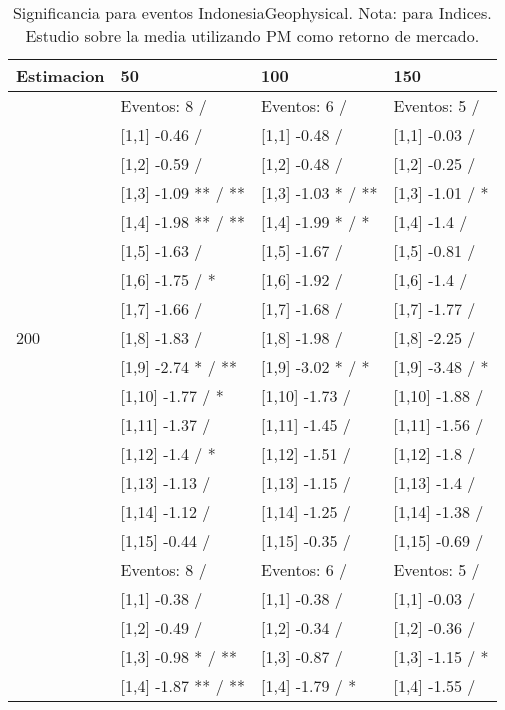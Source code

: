 \begin{table}

\caption{Significancia para eventos IndonesiaGeophysical. Nota: para Indices. Estudio sobre la media utilizando PM como retorno de mercado.}
\centering
\begin{tabular}[t]{llll}
\toprule
Estimacion & 50 & 100 & 150\\
\midrule
 & Eventos:  8 / & Eventos:  6 / & Eventos:  5 /\\
 & {}[1,1] -0.46  / & {}[1,1] -0.48  / & {}[1,1] -0.03  /\\
 & {}[1,2] -0.59  / & {}[1,2] -0.48  / & {}[1,2] -0.25  /\\
 & {}[1,3] -1.09 ** / ** & {}[1,3] -1.03 * / ** & {}[1,3] -1.01  / *\\
 & {}[1,4] -1.98 ** / ** & {}[1,4] -1.99 * / * & {}[1,4] -1.4  /\\
\addlinespace
 & {}[1,5] -1.63  / & {}[1,5] -1.67  / & {}[1,5] -0.81  /\\
 & {}[1,6] -1.75  / * & {}[1,6] -1.92  / & {}[1,6] -1.4  /\\
 & {}[1,7] -1.66  / & {}[1,7] -1.68  / & {}[1,7] -1.77  /\\
200 & {}[1,8] -1.83  / & {}[1,8] -1.98  / & {}[1,8] -2.25  /\\
 & {}[1,9] -2.74 * / ** & {}[1,9] -3.02 * / * & {}[1,9] -3.48  / *\\
\addlinespace
 & {}[1,10] -1.77  / * & {}[1,10] -1.73  / & {}[1,10] -1.88  /\\
 & {}[1,11] -1.37  / & {}[1,11] -1.45  / & {}[1,11] -1.56  /\\
 & {}[1,12] -1.4  / * & {}[1,12] -1.51  / & {}[1,12] -1.8  /\\
 & {}[1,13] -1.13  / & {}[1,13] -1.15  / & {}[1,13] -1.4  /\\
 & {}[1,14] -1.12  / & {}[1,14] -1.25  / & {}[1,14] -1.38  /\\
\addlinespace
 & {}[1,15] -0.44  / & {}[1,15] -0.35  / & {}[1,15] -0.69  /\\
 & Eventos:  8 / & Eventos:  6 / & Eventos:  5 /\\
 & {}[1,1] -0.38  / & {}[1,1] -0.38  / & {}[1,1] -0.03  /\\
 & {}[1,2] -0.49  / & {}[1,2] -0.34  / & {}[1,2] -0.36  /\\
 & {}[1,3] -0.98 * / ** & {}[1,3] -0.87  / & {}[1,3] -1.15  / *\\
\addlinespace
 & {}[1,4] -1.87 ** / ** & {}[1,4] -1.79  / * & {}[1,4] -1.55  /\\

\end{tabular}
\end{table}
